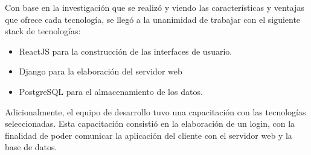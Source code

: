     Con base en la investigación que se realizó y viendo las características y ventajas que ofrece cada tecnología, se llegó a la unanimidad de trabajar con el siguiente stack de tecnologías:
    \begin{itemize}
        \item ReactJS para la construcción de las interfaces de usuario.
        \item Django para la elaboración del servidor web
        \item PostgreSQL para el almacenamiento de los datos.
    \end{itemize}

Adicionalmente, el equipo de desarrollo tuvo una capacitación con las tecnologías seleccionadas. Esta capacitación consistió en la elaboración de un login, con la finalidad de poder comunicar la aplicación del cliente con el servidor web y la base de datos.

